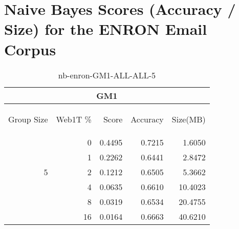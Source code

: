 \chapter{Naive Bayes Scores (Accuracy / Size) for the ENRON Email Corpus}

\begin{center}
\begin{table}[htbp] 
 \begin{center}
\begin{tabular}{ | r | r | r | r | r |}
\hline
\multicolumn{5}{|c|}{GM1}\\
\hline
\begin{sideways}Group Size\end{sideways} & \begin{sideways}Web1T \%\end{sideways} & \begin{sideways}Score\end{sideways} & \begin{sideways}Accuracy\end{sideways} & \begin{sideways}Size(MB)\end{sideways}\\
\hline
\multirow{5}{*}{5}
 & 0 & 0.4495 & 0.7215 & 1.6050\\ \cline{2-5}
 & 1 & 0.2262 & 0.6441 & 2.8472\\ \cline{2-5}
 & 2 & 0.1212 & 0.6505 & 5.3662\\ \cline{2-5}
 & 4 & 0.0635 & 0.6610 & 10.4023\\ \cline{2-5}
 & 8 & 0.0319 & 0.6534 & 20.4755\\ \cline{2-5}
 & 16 & 0.0164 & 0.6663 & 40.6210\\ \cline{2-5}
\hline
\end{tabular}
\caption{nb-enron-GM1-ALL-ALL-5}
\label{table:nb-enron-GM1-ALL-ALL-5}
\end{center}
 \end{table}
\end{center}

